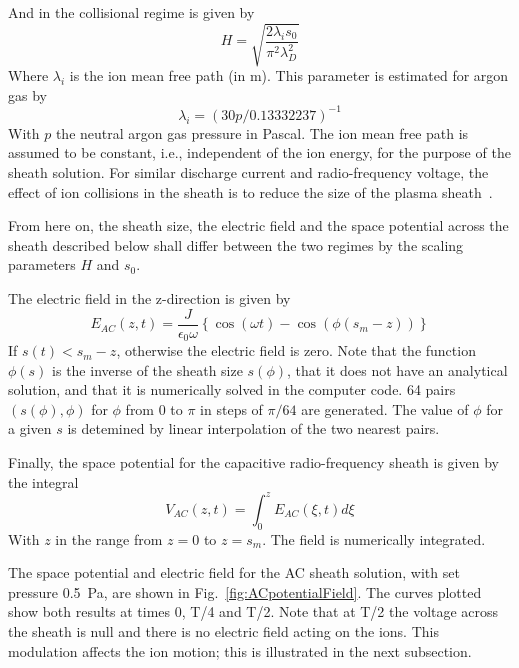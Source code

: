 And in the collisional regime is given by~\cite{Lieberman1989}
\begin{equation}
H = \sqrt{  \frac{2 \lambda_i s_0}{\pi^2 \lambda_D^2}  }
\end{equation}
Where $\lambda_i$ is the ion mean free path (in m). This parameter is estimated for argon gas by~\cite{Lieberman1989}
\begin{equation}
\lambda_i = (30 p /0.13332237)^{-1}
\end{equation}
With $p$ the neutral argon gas pressure in Pascal. The ion mean free path is assumed to be constant, i.e., independent of the ion energy, for the purpose of the sheath solution. For similar discharge current and radio-frequency voltage, the effect of ion collisions in the sheath is to reduce the size of the plasma sheath~\cite{Lieberman1989}.

From here on, the sheath size, the electric field and the space potential across the sheath described below shall differ between the two regimes by the scaling parameters $H$ and $s_0$.

The electric field in the z-direction is given by 
\begin{equation}
E_{AC}(z,t) = \frac{J}{\epsilon_0 \omega} \left \{ \cos(\omega t) - \cos(\phi(s_m - z)) \right \} 
\end{equation}
If $s(t)<s_m-z$, otherwise the electric field is zero. Note that the function $\phi(s)$ is the inverse of the sheath size $s(\phi)$, that it does not have an analytical solution, and that it is numerically solved in the computer code. 64 pairs $(s(\phi), \phi)$ for $\phi$ from 0 to $\pi$ in steps of $\pi/64$ are generated. The value of $\phi$ for a given $s$ is detemined by linear interpolation of the two nearest pairs.   

Finally, the space potential for the capacitive radio-frequency sheath is given by the integral
\begin{equation}
V_{AC}(z,t) = \int_{0}^{z} E_{AC}(\xi, t) d\xi
\end{equation}
With $z$ in the range from $z=0$ to $z=s_m$. The field is numerically integrated.  

The space potential and electric field for the AC sheath solution, with set pressure 0.5~Pa, are shown in Fig.~\ref{fig:ACpotentialField}. The curves plotted show both results at times 0, T/4 and T/2. Note that at T/2 the voltage across the sheath is null and there is no electric field acting on the ions. This modulation affects the ion motion; this is illustrated in the next subsection. 

